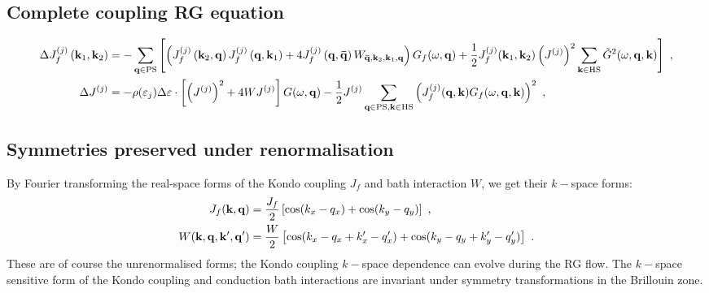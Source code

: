 \documentclass[%
reprint,
superscriptaddress,
groupedaddress,
superscriptaddress,
onecolumn,
]{revtex4-2}
\begin{document}
\subsection{Complete coupling RG equation}
\begin{equation}\begin{aligned}\label{rgEquation}
	\Delta J_f^{(j)}\left({\bf k}_1, {\bf k}_2\right) &= -\sum_{{\bf q} \in \text{PS}} \left[\left(J_f^{(j)}\left({\bf k}_2,{\bf q}\right) J_f^{(j)}\left({\bf q},{\bf k}_1\right) + 4J_f^{(j)}\left({\bf q}, {\bf \bar q}\right) W_{{\bf \bar q}, {\bf k}_2, {\bf k}_1, {\bf q}}\right) G_f(\omega, {\bf q}) + \frac{1}{2}J_f^{(j)}({\bf k}_1,{\bf k}_2) \left(J^{(j)}\right)^2 \sum_{{\bf k} \in \text{HS}}\tilde G^2(\omega, {\bf q}, {\bf k})\right]~,\\
	\Delta J^{(j)} &= - \rho(\varepsilon_j)\Delta \varepsilon\cdot\left[\left(J^{(j)}\right)^2 + 4WJ^{(j)}\right] G(\omega, {\bf q}) -\frac{1}{2}J^{(j)} \sum_{{\bf q} \in \text{PS} ,{\bf k} \in \text{HS}}\left(J_f^{(j)}({\bf q},{\bf k})G_f(\omega, {\bf q}, {\bf k})\right)^2~,
\end{aligned}\end{equation}

\subsection{Symmetries preserved under renormalisation}
By Fourier transforming the real-space forms of the Kondo coupling \(J_f\) and bath interaction \(W\), we get their \(k-\)space forms:
\begin{equation}\begin{aligned}\label{momentumForm}
	J_f({\bf k}, {\bf q}) &= \frac{J_f}{2}\left[\cos(k_x - q_x) + \cos(k_y - q_y)\right]~,\\
	W({\bf k}, {\bf q}, {\bf k}^\prime, {\bf q}^\prime) &= \frac{W}{2}\left[\cos(k_x - q_x + k^\prime_x - q^\prime_x) + \cos(k_y - q_y + k^\prime_y - q^\prime_y)\right]~.
\end{aligned}\end{equation}
These are of course the unrenormalised forms; the Kondo coupling \(k-\)space dependence can evolve during the RG flow. The \(k-\)space sensitive form of the Kondo coupling and conduction bath interactions are invariant under symmetry transformations in the Brillouin zone.\\
\end{document}
